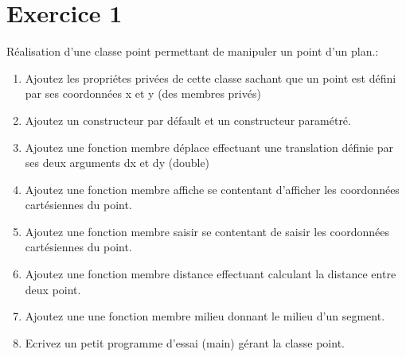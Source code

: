 \section*{Exercice 1}

Réalisation d'une classe point permettant de manipuler un point d'un plan.:

\begin{enumerate}
      \item Ajoutez les propriétes privées de cette classe sachant que un point est défini par ses coordonnées x et y (des membres privés)
            


      \item Ajoutez un constructeur par défault et un constructeur paramétré.
            

      \item Ajoutez une fonction membre déplace effectuant une translation définie par ses deux arguments dx et dy (double)
            

      \item Ajoutez une fonction membre affiche se contentant d'afficher les coordonnées cartésiennes du point.
            

      \item Ajoutez une fonction membre saisir se contentant de saisir les coordonnées cartésiennes du point.
            

      \item Ajoutez une fonction membre distance effectuant calculant la distance entre deux point.
            

      \item Ajoutez une une fonction membre milieu donnant le milieu d'un segment.
            

      \item Ecrivez un petit programme d'essai (main) gérant la classe point.
            

\end{enumerate}
